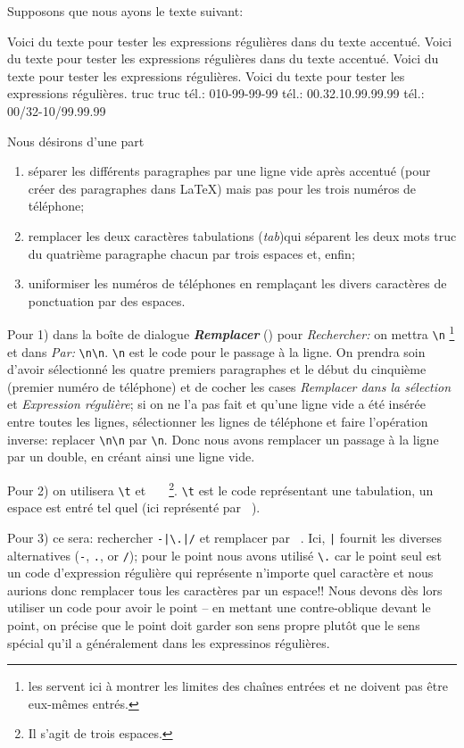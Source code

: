 Supposons que nous ayons le texte suivant:
\begin{verbExample}
Voici du texte pour tester les expressions régulières 
dans du texte accentué. 
Voici du texte pour tester les expressions régulières dans 
du texte accentué. 
Voici du texte pour tester les expressions régulières. Voici 
du texte pour tester les expressions régulières. 
truc          truc
tél.: 010-99-99-99
tél.: 00.32.10.99.99.99
tél.: 00/32-10/99.99.99
\end{verbExample}
Nous désirons d'une part 
\begin{enumerate}
\item séparer les différents paragraphes par une ligne vide après \og accentué\fg{} (pour créer des paragraphes dans \LaTeX) mais pas pour les trois numéros de téléphone; 
\item remplacer les deux caractères tabulations (\textsl{tab})qui séparent les deux mots \og truc\fg{} du quatrième paragraphe chacun par trois espaces et, enfin;
\item uniformiser les numéros de téléphones en remplaçant les divers caractères de ponctuation par des espaces. 
\end{enumerate}

Pour 1) dans la boîte de dialogue \textsl{\textbf{Remplacer}} () pour \emph{Rechercher:} on mettra {\frq\verb+\n+\flq} \footnote{les {\frq\flq} servent ici à montrer les limites des chaînes entrées et ne doivent pas être eux-mêmes entrés.} et dans \emph{Par:} {\frq\verb+\n\n+\flq}. {\frq\verb+\n+\flq} est le code pour le passage à la ligne. On prendra soin d'avoir sélectionné les quatre premiers paragraphes et le début du cinquième (premier numéro de téléphone) et de cocher les cases \emph{Remplacer dans la sélection} et \emph{Expression régulière}; si on ne l'a pas fait et qu'une ligne vide a été insérée entre toutes les lignes, sélectionner les lignes de téléphone et faire l'opération inverse: replacer {\frq\verb+\n\n+\flq} par {\frq\verb+\n+\flq}. Donc nous avons remplacer un passage à la ligne par un double, en créant ainsi une ligne vide.

Pour 2) on utilisera {\frq\verb+\t+\flq} et {\frq\verb*+   +\flq}\footnote{Il s'agit de trois espaces.}.  {\frq\verb+\t+\flq} est le code représentant une tabulation, un espace est entré tel quel (ici représenté par \verb*| |).

Pour 3) ce sera: rechercher {\frq\verb+-|\.|/+\flq} et remplacer par {\frq\verb*+ +\flq}. Ici, {\frq\verb+|+\flq} fournit les diverses alternatives (\verb|-|, \verb|.|, or \verb|/|); pour le point nous avons utilisé {\frq\verb+\.+\flq} car le point seul est un code d'expression régulière qui représente n'importe quel caractère et nous aurions donc remplacer tous les caractères par un espace!! Nous devons dès lors utiliser un code pour avoir le point -- en mettant une contre-oblique devant le point, on précise que le point doit garder son sens propre plutôt que le sens spécial qu'il a généralement dans les expressinos régulières.

